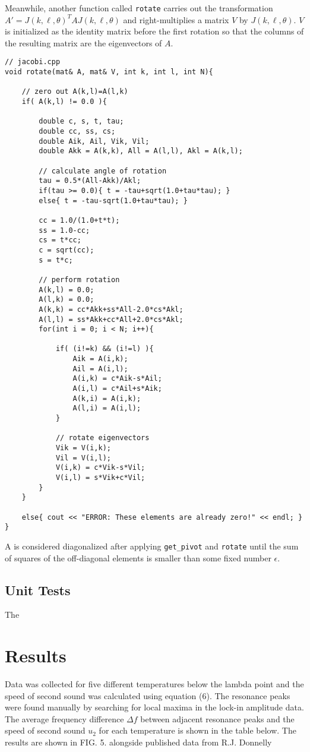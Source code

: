 \documentclass[prb,aps,twocolumn,showpacs,10pt]{revtex4-1}
\begin{document}
\noindent Meanwhile, another function called \texttt{rotate} carries out the transformation $A'=J(k,\ell,\theta)^TAJ(k,\ell,\theta)$ and right-multiplies a matrix $V$ by $J(k,\ell,\theta)$. $V$ is initialized as the identity matrix before the first rotation so that the columns of the resulting matrix are the eigenvectors of $A$. 

\begin{lstlisting}
// jacobi.cpp
void rotate(mat& A, mat& V, int k, int l, int N){

	// zero out A(k,l)=A(l,k)
	if( A(k,l) != 0.0 ){

		double c, s, t, tau;
		double cc, ss, cs;
		double Aik, Ail, Vik, Vil;
		double Akk = A(k,k), All = A(l,l), Akl = A(k,l);

		// calculate angle of rotation
		tau = 0.5*(All-Akk)/Akl;
		if(tau >= 0.0){ t = -tau+sqrt(1.0+tau*tau); }
		else{ t = -tau-sqrt(1.0+tau*tau); }

		cc = 1.0/(1.0+t*t);
		ss = 1.0-cc;
		cs = t*cc;
		c = sqrt(cc);
		s = t*c;

		// perform rotation
		A(k,l) = 0.0;
		A(l,k) = 0.0;
		A(k,k) = cc*Akk+ss*All-2.0*cs*Akl;
		A(l,l) = ss*Akk+cc*All+2.0*cs*Akl;
		for(int i = 0; i < N; i++){

			if( (i!=k) && (i!=l) ){
				Aik = A(i,k);
				Ail = A(i,l);
				A(i,k) = c*Aik-s*Ail;
				A(i,l) = c*Ail+s*Aik;
				A(k,i) = A(i,k);
				A(l,i) = A(i,l);
			}

			// rotate eigenvectors 
			Vik = V(i,k);
			Vil = V(i,l);
			V(i,k) = c*Vik-s*Vil;
			V(i,l) = s*Vik+c*Vil;
		}
	}

	else{ cout << "ERROR: These elements are already zero!" << endl; } 
}
\end{lstlisting}

\noindent A is considered diagonalized after applying \texttt{get\_pivot} and \texttt{rotate} until the sum of squares of the off-diagonal elements is smaller than some fixed number $\epsilon$. 

\subsection{Unit Tests}

The 

\section{Results}

Data was collected for five different temperatures below the lambda point and the speed of second sound was calculated using equation (6). The resonance peaks were found manually by searching for local maxima in the lock-in amplitude data. The average frequency difference $\Delta f$ between adjacent resonance peaks and the speed of second sound $u_2$ for each temperature is shown in the table below. The results are shown in FIG. 5. alongside published data from R.J. Donnelly \cite{donnelly.} 
\end{document}
